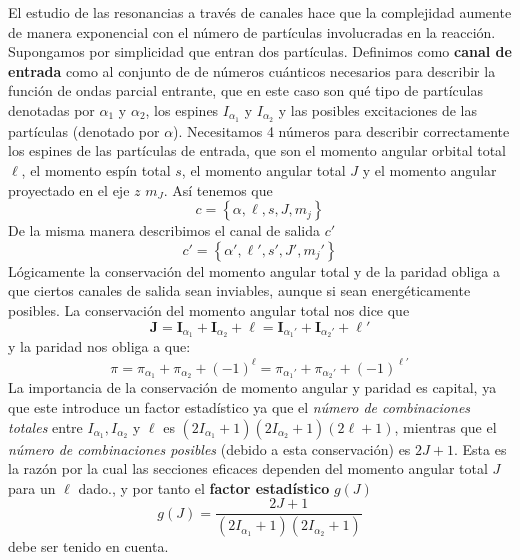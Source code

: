 \documentclass[fleqn,10pt]{SelfArx} %
\newcommand{\In}{\mathbf{I}}
\newcommand{\Jn}{\mathbf{J}}
\begin{document}
El estudio de las resonancias a través de canales hace que la complejidad aumente de manera exponencial con el número de partículas involucradas en la reacción. Supongamos por simplicidad que entran dos partículas. Definimos como \textbf{canal de entrada} como al conjunto de de números cuánticos necesarios para describir la función de ondas parcial entrante, que en este caso son qué tipo de partículas denotadas por  $\alpha_1$ y $\alpha_2$, los espines $I_{\alpha_1}$ y $I_{\alpha_2}$ y las posibles excitaciones de las partículas (denotado por $\alpha$). Necesitamos 4 números para describir correctamente los espines de las partículas de entrada, que son el momento angular orbital total $\ell$, el momento espín total $s$, el momento angular total $J$ y el momento angular proyectado en el eje $z$ $m_J$. Así tenemos que
\begin{equation}
	c = \left\lbrace \alpha,\ell,s,J,m_j \right\rbrace
\end{equation}
De la misma manera describimos el canal de salida $c'$
\begin{equation}
	c' = \left\lbrace \alpha',\ell',s',J',m_j' \right\rbrace
\end{equation}
Lógicamente la conservación del momento angular total y de la paridad obliga a que ciertos canales de salida sean inviables, aunque si sean energéticamente posibles. La conservación del momento angular total nos dice que
\begin{equation}
	\Jn = \In_{\alpha_1}+\In_{\alpha_2}+\ell =  \In_{\alpha_1'}+\In_{\alpha_2'}+\ell' 
\end{equation}
y la paridad nos obliga a que:
\begin{equation}
	\pi = \pi_{\alpha_1}+\pi_{\alpha_2}+(-1)^{\ell} =  \pi_{\alpha_1'}+ \pi_{\alpha_2'} +(-1)^{\ell'} 
\end{equation}
La importancia de la conservación de momento angular y paridad es capital, ya que este introduce un factor estadístico ya que el \textit{número de combinaciones totales} entre $I_{\alpha_1}, I_{\alpha_2}$ y $\ell$ es $(2I_{\alpha_1}+1)(2I_{\alpha_2}+1)(2\ell+1)$, mientras que el \textit{número de combinaciones posibles} (debido a esta conservación) es $2J+1$. Esta es la razón por la cual las secciones eficaces dependen del momento angular total $J$ para un $\ell$ dado., y por tanto el \textbf{factor estadístico} $g(J)$
\begin{equation}
	g(J)=\frac{2J+1}{(2I_{\alpha_1}+1)(2I_{\alpha_2}+1)}
\end{equation}
debe ser tenido en cuenta.
\end{document}
